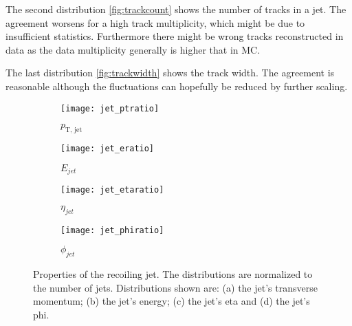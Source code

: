 The second distribution \ref{fig:trackcount} shows the number of tracks in a jet. The agreement worsens for a high track multiplicity, which might be due to insufficient statistics. Furthermore there might be wrong tracks reconstructed in data as the data multiplicity generally is higher that in MC.

The last distribution \ref{fig:trackwidth} shows the track width. The agreement is reasonable although the fluctuations can hopefully be reduced by further scaling.



\begin{figure}[h]
\centering
\begin{subfigure}[b]{0.5\figwidth}
\texttt{[image: jet\_ptratio]}
\caption[Transverse momentum of the recoiling jet]{$\ensuremath{p_{\text{T, jet}}}\xspace$}
\label{fig:jetpt}
\end{subfigure}
\quad
\begin{subfigure}[b]{0.5\figwidth}
\texttt{[image: jet\_eratio]}
\caption[Energy of the recoiling jet]{$E_{jet}$}
\label{fig:jete}
\end{subfigure}


\begin{subfigure}[b]{0.5\figwidth}
\texttt{[image: jet\_etaratio]}
\caption[$\eta$ of the recoiling jet]{$\eta_{jet}$}
\label{fig:jeteta}
\end{subfigure}
\quad
\begin{subfigure}[b]{0.5\figwidth}
\texttt{[image: jet\_phiratio]}
\caption[$\phi$ of the recoiling jet]{$\phi_{jet}$}
\label{fig:jetphi}
\end{subfigure}
\caption{Properties of the recoiling jet. The distributions are normalized to the number of jets. Distributions shown are: (a) the jet's transverse momentum; (b) the jet's energy; (c) the jet's eta and (d) the jet's phi.}
\label{fig:reoilingjet}
\end{figure}




